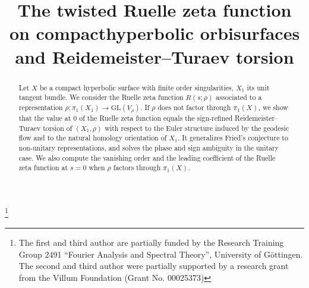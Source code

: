 \documentclass[JEP,XML,SOM,Unicode,NoFloatCountersInSection,published]{cedram}
\theoremstyle{plain}
\theoremstyle{definition}
\theoremstyle{remark}
\numberwithin{equation}{section}
\begin{document}
\frontmatter
\title[On Fried’s conjecture for unit tangent bundles of hyperbolic surfaces]{The twisted Ruelle zeta function on compact\nobreakspace hyperbolic orbisurfaces and Reidemeister--Turaev torsion}

\author[\initial{L.} \lastname{Bénard}]{ }
\address{Institut de Mathématiques de Marseille, Aix--Marseille Université\\
Site de Saint Charles, 3 place Victor Hugo, Case 19, 13331 Marseille Cedex 3, France}
\urladdr{}

\author[\initial{J.} \lastname{Frahm}]{ }
\address{Department of Mathematics, Aarhus University\\
Ny Munkegade 118, 8000 Aarhus C, Denmark}
\urladdr{}

\author[\initial{P.} \lastname{Spilioti}]{ }
\address{Mathematisches Institut, Georg--August Universität Göttingen, Bunsenstraße 3--5, 37073 Göttingen, Germany}
\urladdr{}

\thanks{ The first and third author are partially funded by the Research Training Group 2491 ``Fourier Analysis and Spectral Theory'', University of Göttingen. The second and third author were partially supported by a research grant from the Villum Foundation (Grant No. 00025373)}

\begin{abstract}
Let $X$ be a compact hyperbolic surface with finite order singularities, $X_1$ its unit tangent bundle. We consider the Ruelle zeta function $R(s;\rho)$ associated to a representation $\rho \colon \pi_1(X_1) \to \mathrm{GL}(V_\rho)$. If $\rho$ does not factor through $\pi_1(X)$, we show that the value at $0$ of the Ruelle zeta function equals the sign-refined Reidemeister--Turaev torsion of $(X_1, \rho)$ with respect to the Euler structure induced by the geodesic flow and to the natural homology orientation of $X_1$. It generalizes Fried's conjecture to non-unitary representations, and solves the phase and sign ambiguity in the unitary case. We also compute the vanishing order and the leading coefficient of the Ruelle zeta function at $s=0$ when $\rho$ factors through $\pi_1(X)$.
\end{abstract}


\end{document}

